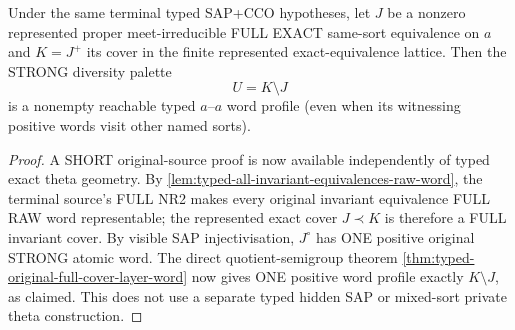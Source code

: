 \begin{theorem}
\label{thm:typed-cover-layer-reachable}
Under the same terminal typed SAP+CCO
hypotheses, let $J$ be a nonzero represented
proper meet-irreducible FULL EXACT same-sort
equivalence on $a$ and $K=J^+$ its cover
in the finite represented exact-equivalence
lattice. Then the STRONG diversity palette
\[
                         U=K\setminus J
\]
is a nonempty reachable typed $a$--$a$
word profile (even when its witnessing
positive words visit other named sorts).
\end{theorem}
\begin{proof}
A SHORT original-source proof is now available
independently of typed exact theta geometry.
By \cref{lem:typed-all-invariant-equivalences-raw-word},
the terminal source's FULL NR2 makes every
original invariant equivalence FULL RAW word
representable; the represented exact cover
$J\prec K$ is therefore a FULL invariant cover.
By visible SAP injectivisation, $J^\circ$
has ONE positive original STRONG atomic word.
The direct quotient-semigroup theorem
\cref{thm:typed-original-full-cover-layer-word}
now gives ONE positive word profile exactly
$K\setminus J$, as claimed.
This does not use a separate typed hidden
SAP or mixed-sort private theta construction.

\end{proof}

